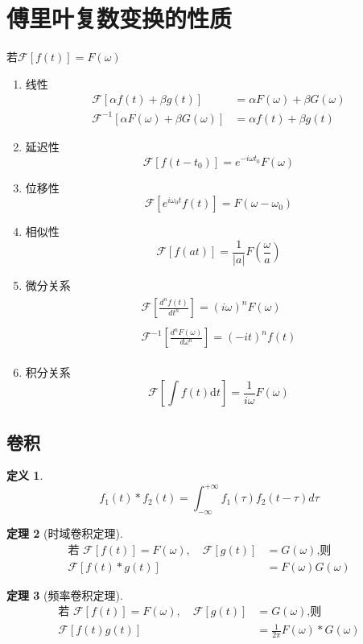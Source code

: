 \documentclass[11pt, a4paper, twoside]{ctexbook}
\newtheorem{theorem}{定理}[section]
\newtheorem{definition}[theorem]{定义}
\begin{document}
\section{傅里叶复数变换的性质}
若$\mathscr{F}[f(t)] = F(\omega)$
\begin{enumerate}
    \item 线性 $$\begin{aligned}\mathscr{F}[\alpha f(t)+\beta g(t)]&=\alpha F(\omega)+\beta G(\omega)\\\mathscr{F}^{-1}[\alpha F(\omega)+\beta G(\omega)]&=\alpha f(t)+\beta g(t)\end{aligned}$$
    \item 延迟性 $$\mathscr{F}[f(t-t_0)]=e^{-i\omega t_0}F(\omega)$$
    \item 位移性 $$\mathscr{F}[e^{i\omega_0t}f(t)] = F(\omega-\omega_0)$$
    \item 相似性 $$\mathscr{F}[f(at)]=\frac1{|a|}F\left(\frac\omega a\right)$$
    \item 微分关系 $$\begin{gathered}\begin{aligned}\mathscr{F}\left[\frac{d^nf(t)}{dt^n}\right]=(i\omega)^nF(\omega)\end{aligned} \\\begin{aligned}\mathscr{F}^{-1}\left[\frac{d^nF(\omega)}{d\omega^n}\right]=(-it)^nf(t)\end{aligned} \end{gathered}$$
    \item 积分关系 $$\mathscr{F}[\int f(t)\mathrm{d}t]=\frac1{i\omega}F(\omega)$$
\end{enumerate}
\subsection{卷积}
\begin{definition}
    $$f_1(t)*f_2(t)=\int_{-\infty}^{+\infty}f_1(\tau)f_2(t-\tau)d\tau $$
\end{definition}
\begin{theorem}[时域卷积定理]
    $$\begin{aligned}\text{若 }\mathscr{F}[f(t)]=F(\omega),\quad\mathscr{F}[g(t)]&=G(\omega)\text{,则}\\\mathscr{F}[f(t)*g(t)]&=F(\omega)G(\omega)\end{aligned}$$ 
\end{theorem}
\begin{theorem}[频率卷积定理]
    $$\begin{aligned}\text{若 }\mathscr{F}[f(t)]=F(\omega),\quad\mathscr{F}[g(t)]&=G(\omega)\text{,则}\\\mathscr{F}[f(t)g(t)]&=\frac{1}{2\pi}F(\omega)*G(\omega)\end{aligned}$$  
\end{theorem}
\end{document}
